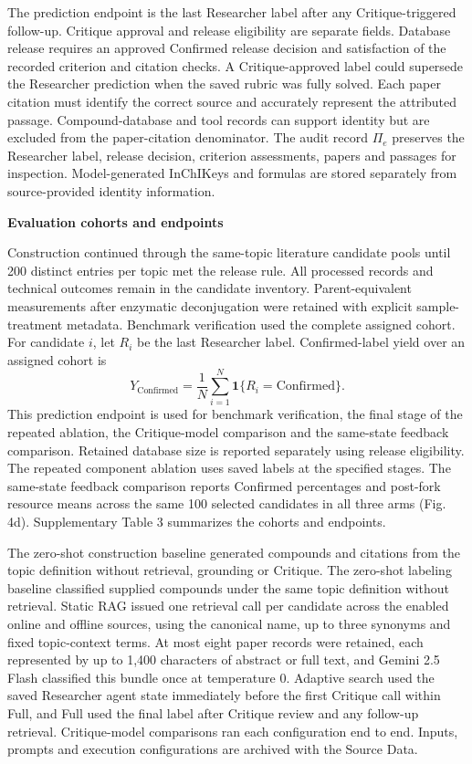 \documentclass[
]{article}
\begin{document}
The prediction endpoint is the last Researcher label after any Critique-triggered follow-up. Critique approval and release eligibility are separate fields. Database release requires an approved Confirmed release decision and satisfaction of the recorded criterion and citation checks. A Critique-approved label could supersede the Researcher prediction when the saved rubric was fully solved. Each paper citation must identify the correct source and accurately represent the attributed passage. Compound-database and tool records can support identity but are excluded from the paper-citation denominator. The audit record $\Pi_e$ preserves the Researcher label, release decision, criterion assessments, papers and passages for inspection. Model-generated InChIKeys and formulas are stored separately from source-provided identity information.

\textbf{Evaluation cohorts and endpoints}

Construction continued through the same-topic literature candidate pools until 200 distinct entries per topic met the release rule. All processed records and technical outcomes remain in the candidate inventory. Parent-equivalent measurements after enzymatic deconjugation were retained with explicit sample-treatment metadata. Benchmark verification used the complete assigned cohort. For candidate $i$, let $R_i$ be the last Researcher label. Confirmed-label yield over an assigned cohort is
\[
Y_{\mathrm{Confirmed}}=\frac{1}{N}\sum_{i=1}^{N}\mathbf{1}\{R_i=\mathrm{Confirmed}\}.
\]
This prediction endpoint is used for benchmark verification, the final stage of the repeated ablation, the Critique-model comparison and the same-state feedback comparison. Retained database size is reported separately using release eligibility. The repeated component ablation uses saved labels at the specified stages. The same-state feedback comparison reports Confirmed percentages and post-fork resource means across the same 100 selected candidates in all three arms (Fig. 4d). Supplementary Table 3 summarizes the cohorts and endpoints.

The zero-shot construction baseline generated compounds and citations from the topic definition without retrieval, grounding or Critique. The zero-shot labeling baseline classified supplied compounds under the same topic definition without retrieval. Static RAG issued one retrieval call per candidate across the enabled online and offline sources, using the canonical name, up to three synonyms and fixed topic-context terms. At most eight paper records were retained, each represented by up to 1,400 characters of abstract or full text, and Gemini 2.5 Flash classified this bundle once at temperature 0. Adaptive search used the saved Researcher agent state immediately before the first Critique call within Full, and Full used the final label after Critique review and any follow-up retrieval. Critique-model comparisons ran each configuration end to end. Inputs, prompts and execution configurations are archived with the Source Data.
\end{document}

